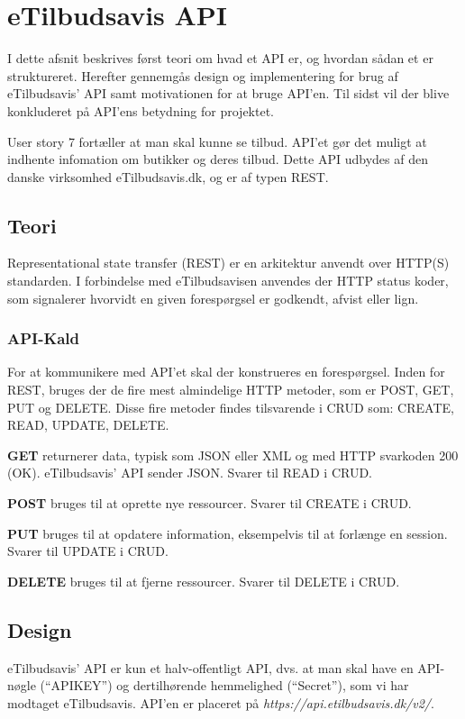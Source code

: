 \section{eTilbudsavis API}\label{api}
I dette afsnit beskrives først teori om hvad et API er, og hvordan sådan et er struktureret.
Herefter gennemgås design og implementering for brug af eTilbudsavis' API samt motivationen for at bruge API'en. 
Til sidst vil der blive konkluderet på API'ens betydning for projektet.

User story 7 fortæller at man skal kunne se tilbud.
API'et gør det muligt at indhente infomation om butikker og deres tilbud.
Dette API udbydes af den danske virksomhed eTilbudsavis.dk, og er af typen REST.

\subsection{Teori}
Representational state transfer (REST) er en arkitektur anvendt over HTTP(S) standarden. 
I forbindelse med eTilbudsavisen anvendes der HTTP status koder, som signalerer hvorvidt en given forespørgsel er godkendt, afvist eller lign.

\subsubsection{API-Kald}
For at kommunikere med API'et skal der konstrueres en forespørgsel.
Inden for REST, bruges der de fire mest almindelige HTTP metoder, som er POST, GET, PUT og DELETE.
Disse fire metoder findes tilsvarende i CRUD som: CREATE, READ, UPDATE, DELETE.

\textbf{GET}
returnerer data, typisk som JSON eller XML og med HTTP svarkoden 200 (OK).
eTilbudsavis' API sender JSON.
Svarer til READ i CRUD.

\textbf{POST}
bruges til at oprette nye ressourcer.
Svarer til CREATE i CRUD.

\textbf{PUT}
bruges til at opdatere information, eksempelvis til at forlænge en session.
Svarer til UPDATE i CRUD.

\textbf{DELETE}
bruges til at fjerne ressourcer.
Svarer til DELETE i CRUD.

\subsection{Design}
eTilbudsavis' API er kun et halv-offentligt API, dvs. at man skal have en API-nøgle (``APIKEY'') og dertilhørende hemmelighed (``Secret''), som vi har modtaget eTilbudsavis.
API'en er placeret på \textit{https://api.etilbudsavis.dk/v2/}. \citep{eTilAPI}

